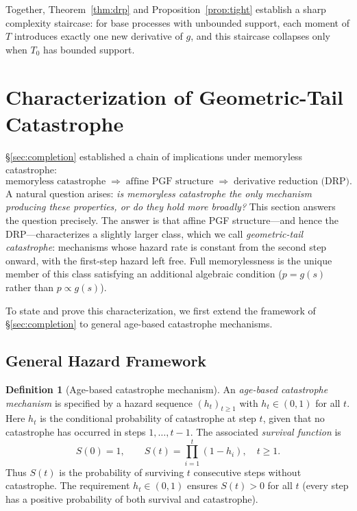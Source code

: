 \documentclass[11pt]{article}
\theoremstyle{plain}
\theoremstyle{definition}
\newtheorem{definition}[theorem]{Definition}
\theoremstyle{remark}
\begin{document}
Together, Theorem~\ref{thm:drp} and Proposition~\ref{prop:tight} establish a sharp complexity staircase: for base processes with unbounded support, each moment of $T$ introduces exactly one new derivative of $g$, and this staircase collapses only when $T_0$ has bounded support.



\section{Characterization of Geometric-Tail Catastrophe}\label{sec:char}

\S\ref{sec:completion} established a chain of implications under memoryless catastrophe:
\[
  \text{memoryless catastrophe}
  \;\Longrightarrow\;
  \text{affine PGF structure}
  \;\Longrightarrow\;
  \text{derivative reduction (DRP)}.
\]
A natural question arises: \emph{is memoryless catastrophe the only mechanism producing these properties, or do they hold more broadly?}  This section answers the question precisely.  The answer is that affine PGF structure---and hence the DRP---characterizes a slightly larger class, which we call \emph{geometric-tail catastrophe}: mechanisms whose hazard rate is constant from the second step onward, with the first-step hazard left free.  Full memorylessness is the unique member of this class satisfying an additional algebraic condition ($p = g(s)$ rather than $p \propto g(s)$).

To state and prove this characterization, we first extend the framework of \S\ref{sec:completion} to general age-based catastrophe mechanisms.


\subsection{General Hazard Framework}\label{sec:hazard}

\begin{definition}[Age-based catastrophe mechanism]\label{def:hazard}
An \emph{age-based catastrophe mechanism} is specified by a hazard sequence $(h_t)_{t \geq 1}$ with $h_t \in (0,1)$ for all $t$.  Here $h_t$ is the conditional probability of catastrophe at step $t$, given that no catastrophe has occurred in steps $1, \ldots, t-1$.  The associated \emph{survival function} is
\begin{equation}\label{eq:survival}
  S(0) = 1, \qquad S(t) = \prod_{i=1}^{t}(1 - h_i), \quad t \geq 1.
\end{equation}
Thus $S(t)$ is the probability of surviving $t$ consecutive steps without catastrophe.  The requirement $h_t \in (0,1)$ ensures $S(t) > 0$ for all $t$ (every step has a positive probability of both survival and catastrophe).
\end{definition}
\end{document}
